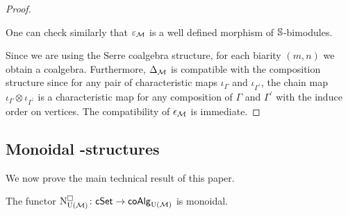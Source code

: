 \begin{proof}
\begin{center}
		\qquad
	\end{center}
	One can check similarly that $\varepsilon_\M$ is a well defined morphism of $\S$-bimodules.

	Since we are using the Serre coalgebra structure, for each biarity $(m,n)$ we obtain a coalgebra.
	Furthermore, $\Delta_\M$ is compatible with the composition structure since for any pair of characteristic maps $\iota_\Gamma$ and $\iota_{\Gamma^\prime}$, the chain map $\iota_\Gamma \otimes \iota_{\Gamma^\prime}$ is a characteristic map for any composition of $\Gamma$ and $\Gamma^\prime$ with the induce order on vertices.
	The compatibility of $\epsilon_\M$ is immediate.
\end{proof}

\subsection{Monoidal \pdfEinfty-structures}

We now prove the main technical result of this paper.

\begin{lemma} \label{l:cubical e-infty chains are monoidal}
	The functor $\cchainsUM \colon \cSet \to \coAlg_\UM$ is monoidal.
\end{lemma}

